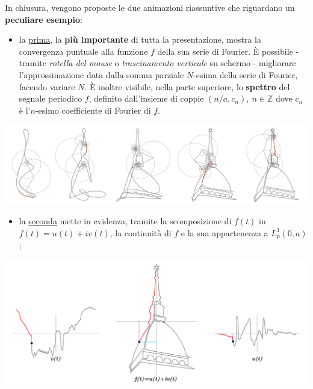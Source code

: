 \documentclass[
]{book}
\providecommand{\tightlist}{%
  \setlength{\itemsep}{0pt}\setlength{\parskip}{0pt}}
\begin{document}
In chiusura, vengono proposte le due animazioni riassuntive che riguardano un \textbf{peculiare esempio}:

\begin{itemize}
\tightlist
\item
  la \href{https://bradwave.github.io/thesis/\#/serie-di-fourier}{prima}, la \textbf{più importante} di tutta la presentazione, mostra la convergenza puntuale alla funzione \(f\) della sua serie di Fourier. È possibile - tramite \emph{rotella del mouse} o \emph{trascinamento verticale} su schermo - migliorare l'approssimazione data dalla somma parziale \(N\)-esima della serie di Fourier, facendo variare \(N\). È inoltre visibile, nella parte superiore, lo \textbf{spettro} del segnale periodico \(f\), definito dall'insieme di coppie \((n/a,c_n), \ n \in \mathbb{Z}\) dove \(c_n\) è l'\(n\)-esimo coefficiente di Fourier di \(f\).
\end{itemize}

\begin{center}\includegraphics[width=1\linewidth]{_images/serie-fourier} \end{center}

\begin{itemize}
\tightlist
\item
  la \href{https://bradwave.github.io/thesis/\#/scomposizione}{seconda} mette in evidenza, tramite la scomposizione di \(f(t)\) in \(f(t)=u(t)+iv(t)\), la continuità di \(f\) e la sua appartenenza a \(L^1_p(0,a)\);
\end{itemize}

\begin{center}\includegraphics[width=1\linewidth]{_images/decomp} \end{center}
\end{document}
